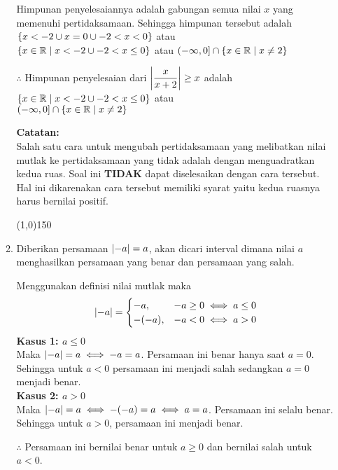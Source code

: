 \begin{enumerate}[leftmargin=*, label={\arabic*}.]
\begin{enumerate}[label={\alph*}.]
    Himpunan penyelesaiannya adalah gabungan semua nilai $x$ yang memenuhi pertidaksamaan. 
    Sehingga himpunan tersebut adalah 
    $\set*{x < -2 \cup x = 0 \cup -2 < x < 0}$ 
    atau \\
    $\set*{x \in \mathbb{R} \mid x < -2 \cup -2 < x \leq 0}$
    atau
    $\oic*{-\infty,0} \cap \set{x \in \mathbb{R} \mid x \neq 2}$

    $\therefore$ Himpunan penyelesaian dari 
    $\ds \abs*{\frac{x}{x+2}} \geq x$ adalah 
    $\set*{x \in \mathbb{R} \mid x < -2 \cup -2 < x \leq 0}$
    atau \\
    $\oic*{-\infty,0} \cap \set{x \in \mathbb{R} \mid x \neq 2}$

    \vspace{0.1cm}
    \textbf{Catatan:}\\
    Salah satu cara untuk mengubah pertidaksamaan yang melibatkan nilai mutlak ke 
    pertidaksamaan yang tidak adalah dengan menguadratkan kedua ruas. Soal ini \textbf{TIDAK} 
    dapat diselesaikan dengan cara tersebut. Hal ini dikarenakan cara tersebut memiliki syarat 
    yaitu kedua ruasnya harus bernilai positif.


\begin{center}\line(1,0){150}\end{center}


    \item Diberikan persamaan $\abs{-a} = a$, akan dicari interval dimana nilai $a$ menghasilkan
    persamaan yang benar dan persamaan yang salah.

    Menggunakan definisi nilai mutlak maka
    \[
        \abs{-a} = 
        \begin{cases}
            -a, &-a \geq 0 \iff a \leq 0\\
            -(-a), &-a < 0 \iff a > 0
        \end{cases}
    \]
    \textbf{Kasus 1: $a \leq 0$}\\
    Maka $\abs{-a} = a \iff -a = a$. Persamaan ini benar hanya saat $a = 0$.\\
    Sehingga untuk $a < 0$ persamaan ini menjadi salah sedangkan $a = 0$ menjadi benar.\\
    \textbf{Kasus 2: $a > 0$}\\
    Maka $\abs{-a} = a \iff -(-a) = a \iff a = a$. Persamaan ini 
    selalu benar. Sehingga untuk $a > 0$, persamaan ini menjadi benar.

    $\therefore$ Persamaan ini bernilai benar untuk $a \geq 0$ dan bernilai salah untuk $a < 0$.
    

\end{enumerate}
\end{enumerate}
